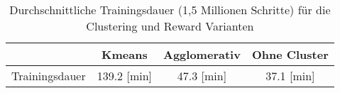 \begin{table}[ht]
\caption{Durchschnittliche Trainingsdauer (1,5 Millionen Schritte) für die Clustering und Reward Varianten}
\centering
\label{tab:zeiten_training}
\begin{tabular}{lccc}
\hline
 & \textbf{Kmeans} & \textbf{Agglomerativ} & \textbf{Ohne Cluster} \\
\hline
Trainingsdauer & 139.2 [min] & 47.3 [min] & 37.1 [min] \\
\hline
\end{tabular}
\end{table}
